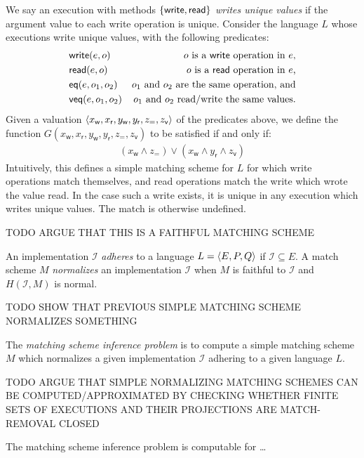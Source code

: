 \begin{example}

  We say an execution with methods ${\{{\mathsf{write}, \mathsf{read}}\}}$
  \emph{writes unique values} if the argument value to each write operation is
  unique. Consider the language $L$ whose executions write unique values, with
  the following predicates:
  \begin{align*}
    & \mathsf{write}(e,o) & \text{$o$ is a {\sf write} operation in $e$}, \\
    & \mathsf{read}(e,o) & \text{$o$ is a {\sf read} operation in $e$,} \\
    & \mathsf{eq}(e,o_1,o_2) & \text{$o_1$ and $o_2$ are the same operation, and} \\
    & \mathsf{veq}(e,o_1,o_2) & \text{$o_1$ and $o_2$ read/write the same values.}
  \end{align*}
  Given a valuation ${\left\langle{x_\mathsf{w}, x_\mathsf{r}, y_\mathsf{w},
  y_\mathsf{r}, z_\mathsf{=}, z_\mathsf{v}}\right\rangle}$ of the predicates above, we define
  the function $G(x_\mathsf{w}, x_\mathsf{r}, y_\mathsf{w}, y_\mathsf{r},
  z_\mathsf{=}, z_\mathsf{v})$ to be satisfied if and only if:
  \begin{align*}
    ( x_\mathsf{w} \land z_\mathsf{=} )
    \lor ( x_\mathsf{w} \land y_\mathsf{r} \land z_\mathsf{v} )
  \end{align*}
  Intuitively, this defines a simple matching scheme for $L$ for which write
  operations match themselves, and read operations match the write which wrote
  the value read. In the case such a write exists, it is unique in any
  execution which writes unique values. The match is otherwise undefined.

  TODO ARGUE THAT THIS IS A FAITHFUL MATCHING SCHEME 

\end{example}

An implementation $\mathcal{I}$ \emph{adheres} to a language $L = {\left\langle{E,P,Q}\right\rangle}$
if $\mathcal{I} \subseteq E$. A match scheme $M$ \emph{normalizes} an
implementation $\mathcal{I}$ when $M$ is faithful to $\mathcal{I}$ and
$H(\mathcal{I},M)$ is normal.

\begin{example}

  TODO SHOW THAT PREVIOUS SIMPLE MATCHING SCHEME NORMALIZES SOMETHING

\end{example}

\begin{definition}

  The \emph{matching scheme inference problem} is to compute a simple matching
  scheme $M$ which normalizes a given implementation $\mathcal{I}$ adhering to
  a given language $L$.

\end{definition}

TODO ARGUE THAT SIMPLE NORMALIZING MATCHING SCHEMES CAN BE
COMPUTED/APPROXIMATED BY CHECKING WHETHER FINITE SETS OF EXECUTIONS AND THEIR
PROJECTIONS ARE MATCH-REMOVAL CLOSED

\begin{theorem}

  The matching scheme inference problem is computable for \ldots

\end{theorem}
